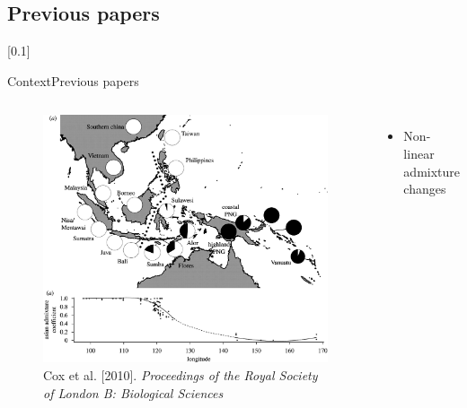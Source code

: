 \documentclass[10pt, aspectratio=43]{beamer}
\begin{document}
\subsection{Previous papers}
[0.1]{}{}{}
\begin{frame}{Context}{Previous papers}
\begin{columns}
  \begin{figure}
    \includegraphics[width=1\textwidth]{../data/cox-image-modified.jpg}
    \caption{Cox et al. [2010]. \textit{Proceedings of
the Royal Society of London B: Biological Sciences}}
  \end{figure}

  \begin{itemize}
    \item Non-linear admixture changes
  \end{itemize}

\end{columns}
\end{frame}
\end{document}
